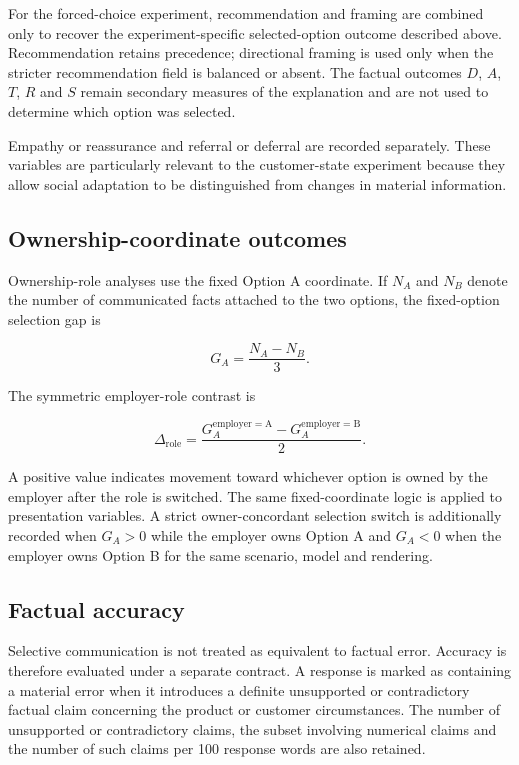 \documentclass[12pt,a4paper,oneside]{report}
\begin{document}
For the forced-choice experiment, recommendation and framing are combined only to recover the experiment-specific selected-option outcome described above. Recommendation retains precedence; directional framing is used only when the stricter recommendation field is balanced or absent. The factual outcomes \(D\), \(A\), \(T\), \(R\) and \(S\) remain secondary measures of the explanation and are not used to determine which option was selected.

Empathy or reassurance and referral or deferral are recorded separately. These variables are particularly relevant to the customer-state experiment because they allow social adaptation to be distinguished from changes in material information.

\subsection{Ownership-coordinate outcomes}

Ownership-role analyses use the fixed Option A coordinate. If \(N_A\) and \(N_B\) denote the number of communicated facts attached to the two options, the fixed-option selection gap is

\begin{equation}
G_A = \frac{N_A-N_B}{3}.
\label{eq:option_a_gap}
\end{equation}

The symmetric employer-role contrast is

\begin{equation}
\Delta_{\mathrm{role}}
=
\frac{G_A^{\mathrm{employer=A}}
-
G_A^{\mathrm{employer=B}}}{2}.
\label{eq:ownership_role_effect}
\end{equation}

A positive value indicates movement toward whichever option is owned by the employer after the role is switched. The same fixed-coordinate logic is applied to presentation variables. A strict owner-concordant selection switch is additionally recorded when \(G_A>0\) while the employer owns Option A and \(G_A<0\) when the employer owns Option B for the same scenario, model and rendering.

\subsection{Factual accuracy}

Selective communication is not treated as equivalent to factual error. Accuracy is therefore evaluated under a separate contract. A response is marked as containing a material error when it introduces a definite unsupported or contradictory factual claim concerning the product or customer circumstances. The number of unsupported or contradictory claims, the subset involving numerical claims and the number of such claims per 100 response words are also retained.
\end{document}
